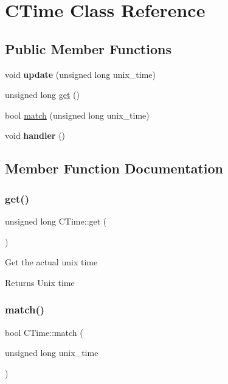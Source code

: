\hypertarget{class_c_time}{}\section{C\+Time Class Reference}
\label{class_c_time}
\subsection*{Public Member Functions}
\begin{DoxyCompactItemize}
\item 
\mbox{\label{class_c_time_a2bcc51d6af92cb1d3145c754f5e00be7}} 
void {\bfseries update} (unsigned long unix\+\_\+time)
\item 
unsigned long \hyperlink{class_c_time_a5893514c278970e4ab40b6bd338f0850}{get} ()
\item 
bool \hyperlink{class_c_time_a39e22cf3416d9043ae9f72ec69ad3f7f}{match} (unsigned long unix\+\_\+time)
\item 
\mbox{\label{class_c_time_a36bd3018e45c14f5261bf6a4bfd54f3f}} 
void {\bfseries handler} ()
\end{DoxyCompactItemize}


\subsection{Member Function Documentation}
\mbox{\label{class_c_time_a5893514c278970e4ab40b6bd338f0850}} 
\subsubsection{\texorpdfstring{get()}{get()}}
{\footnotesize\ttfamily unsigned long C\+Time\+::get (\begin{DoxyParamCaption}{ }\end{DoxyParamCaption})}

Get the actual unix time \begin{DoxyReturn}{Returns}
Unix time 
\end{DoxyReturn}
\mbox{\label{class_c_time_a39e22cf3416d9043ae9f72ec69ad3f7f}} 
\subsubsection{\texorpdfstring{match()}{match()}}
{\footnotesize\ttfamily bool C\+Time\+::match (\begin{DoxyParamCaption}\item[{unsigned long}]{unix\+\_\+time }\end{DoxyParamCaption})}

